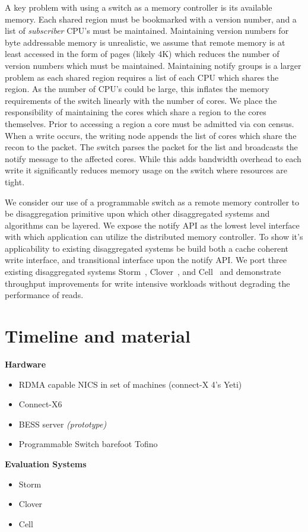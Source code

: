A key problem with using a switch as a memory controller is its
available memory. Each shared region must be bookmarked with a version
number, and a list of \textit{subscriber} CPU's must be maintained.
Maintaining version numbers for byte addressable memory is
unrealistic, we assume that remote memory is at least accessed in the
form of pages (likely 4K) which reduces the number of version numbers
which must be maintained. Maintaining notify groups is a larger
problem as each shared region requires a list of each CPU which shares
the region. As the number of CPU's could be large, this inflates the
memory requirements of the switch linearly with the number of cores.
We place the responsibility of maintaining the cores which share a
region to the cores themselves. Prior to accessing a region a core
must be admitted via con census. When a write occurs, the writing node
appends the list of cores which share the recon to the packet. The
switch parses the packet for the list and broadcasts the notify
message to the affected cores. While this adds bandwidth overhead to
each write it significantly reduces memory usage on the switch where
resources are tight. 


We consider our use of a programmable switch as a remote memory
controller to be disaggregation primitive upon which other
disaggregated systems and algorithms can be layered. We expose the
notify API as the lowest level interface with which application can
utilize the distributed memory controller. To show it's applicability
to existing disaggregated systems be build both a cache coherent write
interface, and transitional interface upon the notify API. We port
three existing disaggregated systems Storm~\cite{storm},
Clover~\cite{clover}, and Cell~\cite{cell} and demonstrate throughput
improvements for write intensive workloads without degrading the
performance of reads.

\section{Timeline and material}

\noindent\textbf{Hardware}
\begin{itemize}
    \item RDMA capable NICS in set of machines (connect-X 4's Yeti)
    \item Connect-X6
    \item BESS server \emph{(prototype)}
    \item Programmable Switch barefoot Tofino
\end{itemize}

\noindent\textbf{Evaluation Systems}
\begin{itemize}
    \item Storm~\cite{storm}
    \item Clover~\cite{clover}
    \item Cell~\cite{cell}
\end{itemize}



